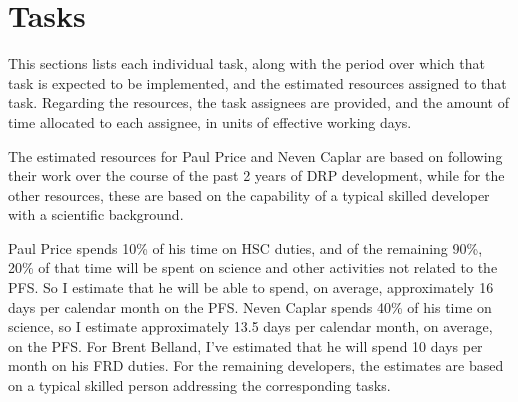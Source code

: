 \section{Tasks}

This sections lists each individual task, along with the period over which that task is expected to be implemented, and the estimated resources assigned to that task. 
Regarding the resources, the task assignees are provided, and the amount of time allocated to each assignee, in units of effective working days.

The estimated resources for Paul Price and Neven Caplar are based on following their work over the course of the past 2 years of DRP development, while for the other
resources, these are based on the capability of a typical skilled developer with a scientific background. 

Paul Price spends 10\% of his time on HSC duties, and of the remaining 90\%, 20\% of that time will be spent on science and other activities not related to the PFS. So I estimate that he will be able to spend, on average, approximately 16 days per calendar month on the PFS. Neven Caplar spends 40\% of his time on science, so I estimate approximately 13.5 days per calendar month, on average, on the PFS. For Brent Belland, I've estimated that he will spend 10 days per month on his FRD duties. For the remaining developers, the estimates are based on a typical skilled person addressing the corresponding tasks. 


